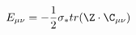 \begin{equation}
\label{e5:44}
E_{\mu \nu}= -\frac{1}{2} \sigma_{\ast} tr(\Z \cdot \C_{\mu \nu})
\end{equation}

